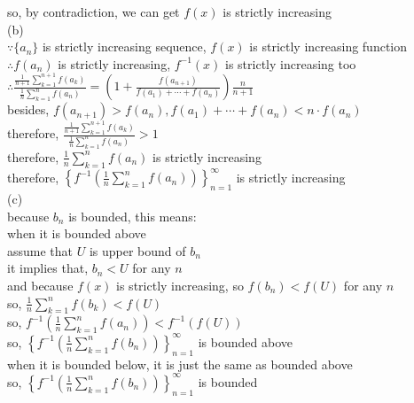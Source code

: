 \documentclass{article}
\begin{document}
so, by contradiction, we can get $f(x)$ is strictly increasing\\

(b)\\

$\because$\qquad$\{a_n\}$ is strictly increasing sequence, $f(x)$ is strictly increasing function\\

$\therefore$\qquad$f(a_n)$ is strictly increasing, $f^{-1}(x)$ is strictly increasing too\\

$\therefore$\qquad$\displaystyle\frac{\frac{1}{n+1}\sum_{k=1}^{n+1}f(a_k)}{\frac{1}{n}\sum_{k=1}^{n}f(a_n)}=\left(1+\frac{f(a_{n+1})}{f(a_1)+\cdots+f(a_n)}\right)\frac{n}{n+1}$\\

besides, $f(a_{n+1})>f(a_n), f(a_1)+\cdots+f(a_n)<n\cdot f(a_n)$\\

therefore, $\displaystyle\frac{\frac{1}{n+1}\sum_{k=1}^{n+1}f(a_k)}{\frac{1}{n}\sum_{k=1}^{n}f(a_n)}>1$\\

therefore, $\frac{1}{n}\sum_{k=1}^{n}f(a_n)$ is strictly increasing\\

therefore, $\left\{f^{-1}(\frac{1}{n}\sum_{k=1}^{n}f(a_n))\right\}_{n=1}^\infty$ is strictly increasing\\

(c)\\

because $b_n$ is bounded, this means:\\

when it is bounded above\\

assume that $U$ is upper bound of $b_n$\\

it implies that, $b_n<U$ for any $n$\\

and because $f(x)$ is strictly increasing, so $f(b_n)<f(U)$ for any $n$\\

so, $\displaystyle\frac{1}{n}\sum_{k=1}^nf(b_k)<f(U)$\\

so, $f^{-1}(\frac{1}{n}\sum_{k=1}^{n}f(a_n))<f^{-1}(f(U))$\\

so, $\left\{f^{-1}(\frac{1}{n}\sum_{k=1}^{n}f(b_n))\right\}_{n=1}^\infty$ is bounded above\\

when it is bounded below, it is just the same as bounded above\\

so, $\left\{f^{-1}(\frac{1}{n}\sum_{k=1}^{n}f(b_n))\right\}_{n=1}^\infty$ is bounded\\ 
\end{document}
